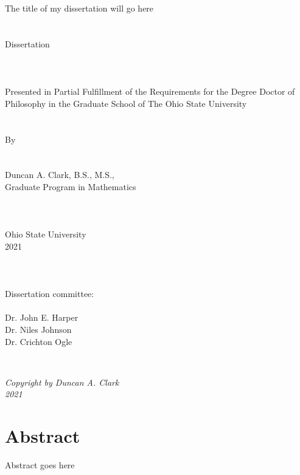 \documentclass[11pt, twoside]{report}
\theoremstyle{definition}
\theoremstyle{remark}
\begin{document}

\begingroup
{}

\thispagestyle{empty}
\begin{center}
    {\Huge The title of my dissertation will go here} \\
    $~$\\
    $~$\\
    \Large Dissertation \\
$~$\\
$~$\\
$~$\\
    Presented in Partial Fulfillment of the Requirements for
the Degree Doctor of Philosophy in the Graduate School of The Ohio State University\\
$~$\\
$~$\\
By \\
$~$\\
$~$\\
    Duncan A. Clark, B.S., M.S.,\\
    Graduate Program in Mathematics\\
$~$\\
$~$\\
$~$\\
Ohio State University\\
2021\\
$~$\\
$~$\\
$~$\\
Dissertation committee:\\
$~$\\
Dr. John E. Harper \\
Dr. Niles Johnson \\
Dr. Crichton Ogle 
    
\end{center}

\newpage



\thispagestyle{empty}
\begin{center}
$~$\vspace{3in}

\textit{Copyright by Duncan A. Clark}\\
\textit{2021}
\vfill
\end{center}
\newpage


\setcounter{page}{1}
\chapter*{Abstract}
Abstract goes here
\end{document}
